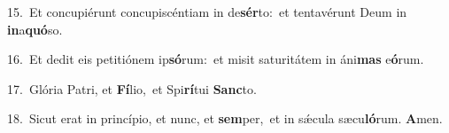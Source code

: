 {\numbfont\textcolor{\numbcolor}{15.}}~Et concupiérunt concupiscéntiam in de\-\textbf{sér}\-to:~\star et tentavérunt Deum in \textbf{in}\-a\-\textbf{quó}\-so.\par
{\numbfont\textcolor{\numbcolor}{16.}}~Et dedit eis petitiónem ip\-\textbf{só}\-rum:~\star et misit saturitátem in áni\textbf{mas} e\-\textbf{ó}\-rum.\par
{\numbfont\textcolor{\numbcolor}{17.}}~Glória Patri, et \textbf{Fí}\-lio,~\star et Spi\-\textbf{rí}\-tui \textbf{Sanc}\-to.\par
{\numbfont\textcolor{\numbcolor}{18.}}~Sicut erat in princípio, et nunc, et \textbf{sem}\-per,~\star et in sǽcula sæcu\-\textbf{ló}\-rum. \textbf{A}\-men.\par
